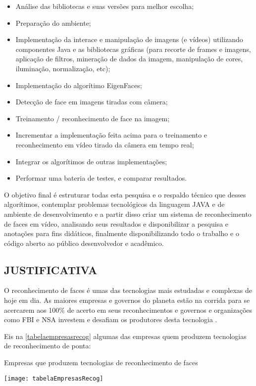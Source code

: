 \begin{itemize}
	\item Análise das bibliotecas e suas versões para melhor escolha;
	\item Preparação do ambiente;
	\item Implementação da interace e manipulação de imagens (e vídeos)  utilizando componentes Java e as bibliotecas gráficas (para  recorte de frames e imagens, aplicação de filtros, mineração de dados da imagem, manipulação de cores, iluminação, normalização, etc);
	\item Implementação do algorítimo EigenFaces;
	\item Detecção de face em imagens tiradas com câmera;
	\item Treinamento / reconhecimento de face na imagem;
	\item Incrementar a implementação feita acima para o treinamento  e reconhecimento em vídeo tirado da câmera em tempo real;
	\item Integrar os algorítimos de outras implementações;
	\item Performar uma bateria de testes, e comparar resultados.
\end{itemize}

O objetivo final é estruturar todas esta pesquisa e o respaldo técnico que desses algorítimos, contemplar problemas tecnológicos da linguagem JAVA e de ambiente de desenvolvimento e a partir disso criar um sistema de reconhecimento de faces em vídeo, analisando seus resultados e disponibilizar a pesquisa e anotações para fins didáticos, finalmente disponibilizando todo o trabalho e o código aberto ao público desenvolvedor e acadêmico.


\subsection{JUSTIFICATIVA} 

O reconhecimento de faces é umas das tecnologias mais estudadas e complexas de hoje em dia. As maiores empresas e governos do planeta estão na corrida para se acercarem aos 100\% de acerto em seus reconhecimentos e governos e organizações como FBI e NSA investem e desafiam os produtores desta tecnologia \cite{nstc_homeland}.

Eis na \autoref{tabelaempresasrecog} algumas das empresas quem produzem tecnologias de reconhecimento de ponta:

\vspace*{5cm}
\begin{table}[h]
	\centering
	\caption{Empresas que produzem tecnologias de reconhecimento de faces}
	\texttt{[image: tabelaEmpresasRecog]}
	\label{tabelaempresasrecog}
\end{table}



